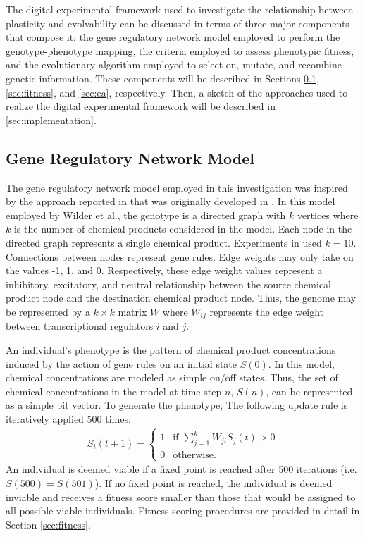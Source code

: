 The digital experimental framework used to investigate the relationship between plasticity and evolvability can be discussed in terms of three major components that compose it: the gene regulatory network model employed to perform the genotype-phenotype mapping, the criteria employed to assess phenotypic fitness, and the evolutionary algorithm employed to select on, mutate, and recombine genetic information.
These components will be described in Sections \ref{sec:grn}, \ref{sec:fitness}, and \ref{sec:ea}, respectively.
Then, a sketch of the approaches used to realize the digital experimental framework will be described in \ref{sec:implementation}.

\subsection{Gene Regulatory Network Model} \label{sec:grn}
The gene regulatory network model employed in this investigation was inspired by the approach reported in \cite{Wilder2015ReconcilingEvolvability} that was originally developed in \cite{Draghi2009TheModel}.
In this model employed by Wilder et al., the genotype is a directed graph with $k$ vertices where $k$ is the number of chemical products considered in the model.
Each node in the directed graph represents a single chemical product.
Experiments in \cite{Wilder2015ReconcilingEvolvability} used $k = 10$.
Connections between nodes represent gene rules.
Edge weights may only take on the values -1, 1, and 0.
Respectively, these edge weight values represent a inhibitory, excitatory, and neutral relationship between the source chemical product node and the destination chemical product node.
Thus, the genome may be represented by a $k \times k$ matrix $W$ where $W_{ij}$ represents the edge weight between transcriptional regulators $i$ and $j$.

An individual's phenotype is the pattern of chemical product concentrations induced by the action of gene rules on an initial state $S(0)$.
In this model, chemical concentrations are modeled as simple on/off states.
Thus, the set of chemical concentrations in the model at time step $n$, $S(n)$, can be represented as a simple bit vector.
To generate the phenotype, The following update rule is iteratively applied 500 times:
\begin{align*}
S_i(t+1) = 
\begin{cases}
1 & \text{if } \sum_{j=1}^{k} W_{ji}S_j(t) > 0 \\
0 & \text{otherwise.}
\end{cases}
\end{align*}
An individual is deemed viable if a fixed point is reached after 500 iterations (i.e. $S(500) = S(501)$).
If no fixed point is reached, the individual is deemed inviable and receives a fitness score smaller than those that would be assigned to all possible viable individuals.
Fitness scoring procedures are provided in detail in Section \ref{sec:fitness}.

